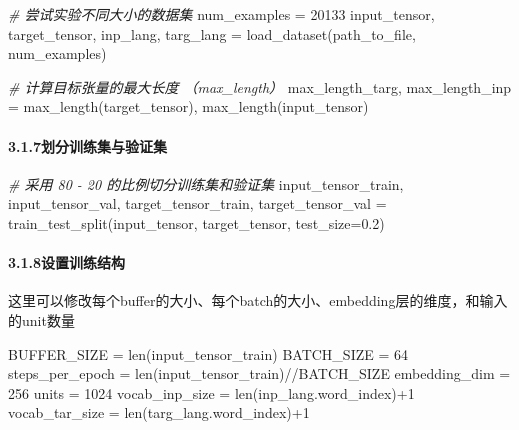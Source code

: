 \documentclass[
]{article}
\newenvironment{Shaded}{}{}
\newcommand{\BuiltInTok}[1]{#1}
\newcommand{\CommentTok}[1]{\textcolor[rgb]{0.38,0.63,0.69}{\textit{#1}}}
\newcommand{\DecValTok}[1]{\textcolor[rgb]{0.25,0.63,0.44}{#1}}
\newcommand{\FloatTok}[1]{\textcolor[rgb]{0.25,0.63,0.44}{#1}}
\newcommand{\NormalTok}[1]{#1}
\newcommand{\OperatorTok}[1]{\textcolor[rgb]{0.40,0.40,0.40}{#1}}
\begin{document}
\begin{Shaded}
\begin{Highlighting}[]
\CommentTok{\# 尝试实验不同大小的数据集}
\NormalTok{num\_examples }\OperatorTok{=} \DecValTok{20133}
\NormalTok{input\_tensor, target\_tensor, inp\_lang, targ\_lang }\OperatorTok{=}\NormalTok{ load\_dataset(path\_to\_file, num\_examples)}

\CommentTok{\# 计算目标张量的最大长度 （max\_length）}
\NormalTok{max\_length\_targ, max\_length\_inp }\OperatorTok{=}\NormalTok{ max\_length(target\_tensor), max\_length(input\_tensor)}
\end{Highlighting}
\end{Shaded}

\hypertarget{header-n111}{%
\paragraph{3.1.7划分训练集与验证集}\label{header-n111}}

\begin{Shaded}
\begin{Highlighting}[]
\CommentTok{\# 采用 80 {-} 20 的比例切分训练集和验证集}
\NormalTok{input\_tensor\_train, input\_tensor\_val, target\_tensor\_train, target\_tensor\_val }\OperatorTok{=}\NormalTok{ train\_test\_split(input\_tensor, target\_tensor, test\_size}\OperatorTok{=}\FloatTok{0.2}\NormalTok{)}
\end{Highlighting}
\end{Shaded}

\hypertarget{header-n113}{%
\paragraph{3.1.8设置训练结构}\label{header-n113}}

这里可以修改每个buffer的大小、每个batch的大小、embedding层的维度，和输入的unit数量

\begin{Shaded}
\begin{Highlighting}[]
\NormalTok{BUFFER\_SIZE }\OperatorTok{=} \BuiltInTok{len}\NormalTok{(input\_tensor\_train)}
\NormalTok{BATCH\_SIZE }\OperatorTok{=} \DecValTok{64}
\NormalTok{steps\_per\_epoch }\OperatorTok{=} \BuiltInTok{len}\NormalTok{(input\_tensor\_train)}\OperatorTok{//}\NormalTok{BATCH\_SIZE}
\NormalTok{embedding\_dim }\OperatorTok{=} \DecValTok{256}
\NormalTok{units }\OperatorTok{=} \DecValTok{1024}
\NormalTok{vocab\_inp\_size }\OperatorTok{=} \BuiltInTok{len}\NormalTok{(inp\_lang.word\_index)}\OperatorTok{+}\DecValTok{1}
\NormalTok{vocab\_tar\_size }\OperatorTok{=} \BuiltInTok{len}\NormalTok{(targ\_lang.word\_index)}\OperatorTok{+}\DecValTok{1}
\end{Highlighting}
\end{Shaded}
\end{document}
